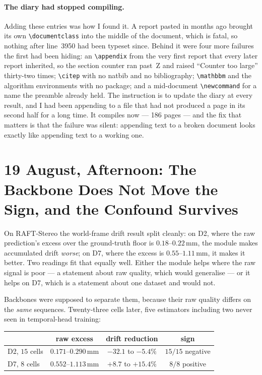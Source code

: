 \documentclass[11pt,a4paper]{article}
\providecommand{\citep}[1]{[#1]}
\begin{document}
\paragraph{The diary had stopped compiling.} Adding these entries was how I found it.
A report pasted in months ago brought its own \verb|\documentclass| into the middle
of the document, which is fatal, so nothing after line~3950 had been typeset since.
Behind it were four more failures the first had been hiding: an \verb|\appendix| from
the very first report that every later report inherited, so the section counter ran
past~Z and raised ``Counter too large'' thirty-two times; \verb|\citep| with no
natbib and no bibliography; \verb|\mathbbm| and the algorithm environments with no
package; and a mid-document \verb|\newcommand| for a name the preamble already held.
The instruction is to update the diary at every result, and I had been appending to a
file that had not produced a page in its second half for a long time. It compiles now
--- 186 pages --- and the fix that matters is that the failure was silent: appending
text to a broken document looks exactly like appending text to a working one.

\section*{19 August, Afternoon: The Backbone Does Not Move the Sign, and the Confound Survives}

On RAFT-Stereo the world-frame drift result split cleanly: on D2, where the raw
prediction's excess over the ground-truth floor is $0.18$--$0.22$\,mm, the module
makes accumulated drift \emph{worse}; on D7, where the excess is $0.55$--$1.11$\,mm,
it makes it better. Two readings fit that equally well. Either the module helps
where the raw signal is poor --- a statement about raw quality, which would
generalise --- or it helps on D7, which is a statement about one dataset and
would not.

Backbones were supposed to separate them, because their raw quality differs on the
\emph{same} sequences. Twenty-three cells later, five estimators including two never
seen in temporal-head training:

\begin{center}
\begin{tabular}{lccc}
\toprule
& raw excess & drift reduction & sign \\
\midrule
D2, $15$ cells & $0.171$--$0.290$\,mm & $-32.1$ to $-5.4\%$ & $15/15$ negative \\
D7, $8$ cells & $0.552$--$1.113$\,mm & $+8.7$ to $+15.4\%$ & $8/8$ positive \\
\bottomrule
\end{tabular}
\end{center}
\end{document}
